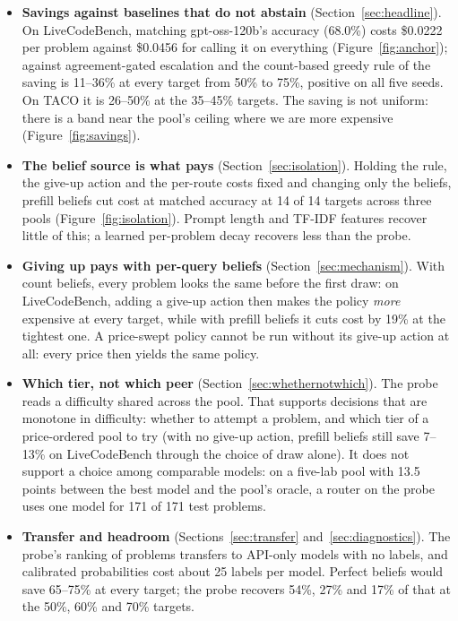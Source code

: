\documentclass[10pt]{article} %
\begin{document}
\begin{itemize}
\item \textbf{Savings against baselines that do not abstain} (Section~\ref{sec:headline}).  On
LiveCodeBench, matching gpt-oss-120b's accuracy (68.0\%) costs \$0.0222 per problem against
\$0.0456 for calling it on everything (Figure~\ref{fig:anchor}); against agreement-gated
escalation and the count-based greedy rule of \citet{chen2026ror} the saving is 11--36\% at
every target from 50\% to 75\%, positive on all five seeds.  On TACO it is 26--50\% at the
35--45\% targets.  The saving is not uniform: there is a band near the pool's ceiling where we
are more expensive (Figure~\ref{fig:savings}).
\item \textbf{The belief source is what pays} (Section~\ref{sec:isolation}).  Holding the rule,
the give-up action and the per-route costs fixed and changing only the beliefs, prefill beliefs
cut cost at matched accuracy at 14 of 14 targets across three pools
(Figure~\ref{fig:isolation}).  Prompt length and TF-IDF features recover little of this; a
learned per-problem decay recovers less than the probe.
\item \textbf{Giving up pays with per-query beliefs} (Section~\ref{sec:mechanism}).  With count
beliefs, every problem looks the same before the first draw: on LiveCodeBench, adding a give-up
action then makes the policy \emph{more} expensive at every target, while with prefill beliefs
it cuts cost by 19\% at the tightest one.  A price-swept policy cannot be run without its
give-up action at all: every price then yields the same policy.
\item \textbf{Which tier, not which peer} (Section~\ref{sec:whethernotwhich}).  The probe reads
a difficulty shared across the pool.  That supports decisions that are monotone in difficulty:
whether to attempt a problem, and which tier of a price-ordered pool to try (with no give-up
action, prefill beliefs still save 7--13\% on LiveCodeBench through the choice of draw alone).
It does not support a choice among comparable models: on a five-lab pool with 13.5 points between
the best model and the pool's oracle, a router on the probe uses one model for 171 of 171 test
problems.
\item \textbf{Transfer and headroom} (Sections~\ref{sec:transfer} and~\ref{sec:diagnostics}).
The probe's ranking of problems transfers to API-only models with no labels, and calibrated
probabilities cost about 25 labels per model.  Perfect beliefs would save 65--75\% at every
target; the probe recovers 54\%, 27\% and 17\% of that at the 50\%, 60\% and 70\% targets.
\end{itemize}
\end{document}
